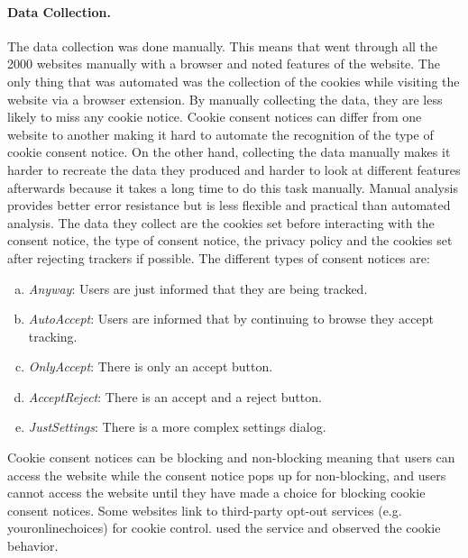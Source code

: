 \paragraph{Data Collection.}
The data collection was done manually. This means that \citeauthor{sanchez2019can} went through all the 2000 websites
manually with a browser and noted features of the website. The only thing that was automated was the collection of the
cookies while visiting the website via a browser extension. By manually collecting the data, they are less likely to miss any cookie notice.
Cookie consent notices can differ from one website to another making it hard to
automate the recognition of the type of cookie consent notice. On the other hand, collecting the data manually makes it harder to recreate the data they produced
and harder to look at different features afterwards because it takes a long time to do this task manually.
Manual analysis provides better error resistance but is
less flexible and practical than automated analysis. The data they collect are the cookies set before interacting with the
consent notice, the type of consent notice, the privacy policy and the cookies set after rejecting trackers if possible.
The different types of consent notices are:
\begin{enumerate}[a)]
    \item \emph{Anyway}: Users are just informed that they are being tracked.
    \item \emph{AutoAccept}: Users are informed that by continuing to browse they accept tracking.
    \item \emph{OnlyAccept}: There is only an accept button.
    \item \emph{AcceptReject}: There is an accept and a reject button.
    \item \emph{JustSettings}: There is a more complex settings dialog.
\end{enumerate}
Cookie consent notices can be blocking and non-blocking meaning that users can access the website while the consent notice pops up for
non-blocking, and users cannot access the website until they have made a choice for blocking cookie consent notices. Some
websites link to third-party opt-out services (e.g. youronlinechoices) for cookie control. \citeauthor{sanchez2019can}
used the service and observed the cookie behavior.

